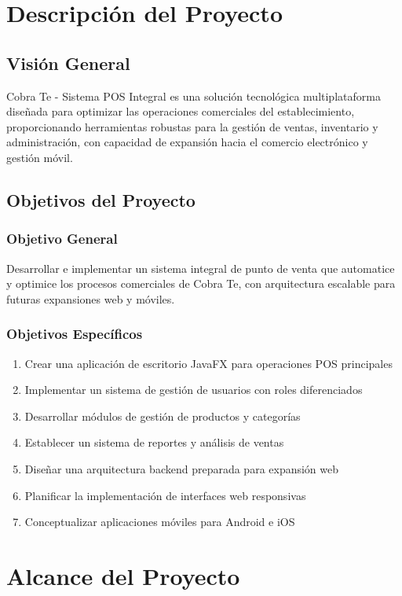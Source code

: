 \documentclass[12pt,letterpaper]{article}
\begin{document}
\section{Descripción del Proyecto}

\subsection{Visión General}
Cobra Te - Sistema POS Integral es una solución tecnológica multiplataforma diseñada para optimizar las operaciones comerciales del establecimiento, proporcionando herramientas robustas para la gestión de ventas, inventario y administración, con capacidad de expansión hacia el comercio electrónico y gestión móvil.

\subsection{Objetivos del Proyecto}

\subsubsection{Objetivo General}
Desarrollar e implementar un sistema integral de punto de venta que automatice y optimice los procesos comerciales de Cobra Te, con arquitectura escalable para futuras expansiones web y móviles.

\subsubsection{Objetivos Específicos}
\begin{enumerate}
    \item Crear una aplicación de escritorio JavaFX para operaciones POS principales
    \item Implementar un sistema de gestión de usuarios con roles diferenciados
    \item Desarrollar módulos de gestión de productos y categorías
    \item Establecer un sistema de reportes y análisis de ventas
    \item Diseñar una arquitectura backend preparada para expansión web
    \item Planificar la implementación de interfaces web responsivas
    \item Conceptualizar aplicaciones móviles para Android e iOS
\end{enumerate}

\section{Alcance del Proyecto}
\end{document}
